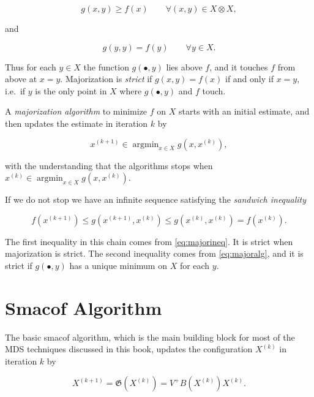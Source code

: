 \documentclass[
  12pt,
]{book}
\theoremstyle{definition}
\theoremstyle{definition}
\theoremstyle{definition}
\theoremstyle{definition}
\theoremstyle{remark}
\begin{document}
\begin{equation}
g(x,y)\geq f(x)\qquad\forall (x,y)\in X\otimes X,
\label{eq:majorineq}
\end{equation}

and

\begin{equation}
g(y,y)=f(y)\qquad\forall y\in X.
\label{eq:majoreq}
\end{equation}

Thus for each \(y\in X\) the function \(g(\bullet,y)\) lies above \(f\), and
it touches \(f\) from above at \(x=y\). Majorization is \emph{strict} if
\(g(x,y)=f(x)\) if and only if \(x=y\), i.e.~if \(y\) is the only point in \(X\)
where \(g(\bullet,y)\) and \(f\) touch.

A \emph{majorization algorithm} to minimize \(f\) on \(X\) starts with an initial
estimate, and then updates the estimate in iteration \(k\) by

\begin{equation}
x^{(k+1)}\in\mathop{\text{argmin}}_{x\in X}g(x,x^{(k)}),
\label{eq:majoralg}
\end{equation}

with the understanding that the algorithms stops when
\(x^{(k)}\in\mathop{\text{argmin}}_{x\in X}g(x,x^{(k)})\).

If we do not stop we have an infinite sequence satisfying the
\emph{sandwich inequality}

\begin{equation}
f(x^{(k+1)})\leq g(x^{(k+1)},x^{(k)})\leq g(x^{(k)},x^{(k)})=f(x^{(k)}).
\label{eq:sandwich}
\end{equation}

The first inequality in this chain comes from \eqref{eq:majorineq}. It is
strict when majorization is strict. The second inequality comes from
\eqref{eq:majoralg}, and it is strict if \(g(\bullet,y)\) has a unique
minimum on \(X\) for each \(y\).

\hypertarget{smacof-algorithm}{%
\section{Smacof Algorithm}\label{smacof-algorithm}}

The basic smacof algorithm, which is the main building block for most of the MDS techniques discussed in this book, updates the configuration \(X^{(k)}\) in iteration \(k\) by

\begin{equation}
X^{(k+1)}=\mathfrak{G}(X^{(k)})=V^+B(X^{(k)})X^{(k)}.
\label{eq:smacofupdate}
\end{equation}
\end{document}
